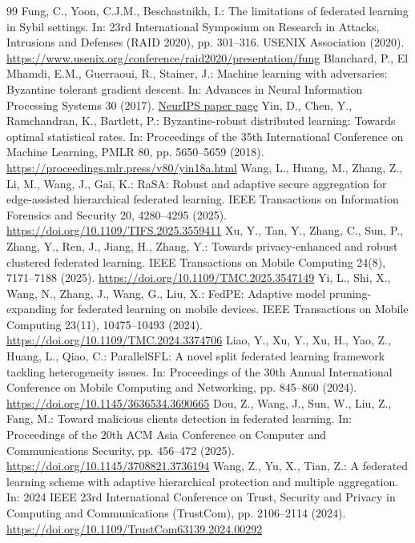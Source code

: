 \documentclass[11pt, a4paper, UTF8, fontset=fandol]{ctexart}
\begin{document}
\begin{thebibliography}{99}
     Fung, C., Yoon, C.J.M., Beschastnikh, I.: The limitations of federated learning in Sybil settings. In: 23rd International Symposium on Research in Attacks, Intrusions and Defenses (RAID 2020), pp. 301--316. USENIX Association (2020). \url{https://www.usenix.org/conference/raid2020/presentation/fung}
     Blanchard, P., El Mhamdi, E.M., Guerraoui, R., Stainer, J.: Machine learning with adversaries: Byzantine tolerant gradient descent. In: Advances in Neural Information Processing Systems 30 (2017). \href{https://papers.nips.cc/paper/6617-machine-learning-with-adversaries-byzantine-tolerant-gradient-descent}{NeurIPS paper page}
     Yin, D., Chen, Y., Ramchandran, K., Bartlett, P.: Byzantine-robust distributed learning: Towards optimal statistical rates. In: Proceedings of the 35th International Conference on Machine Learning, PMLR 80, pp. 5650--5659 (2018). \url{https://proceedings.mlr.press/v80/yin18a.html}
     Wang, L., Huang, M., Zhang, Z., Li, M., Wang, J., Gai, K.: RaSA: Robust and adaptive secure aggregation for edge-assisted hierarchical federated learning. IEEE Transactions on Information Forensics and Security 20, 4280--4295 (2025). \url{https://doi.org/10.1109/TIFS.2025.3559411}
     Xu, Y., Tan, Y., Zhang, C., Sun, P., Zhang, Y., Ren, J., Jiang, H., Zhang, Y.: Towards privacy-enhanced and robust clustered federated learning. IEEE Transactions on Mobile Computing 24(8), 7171--7188 (2025). \url{https://doi.org/10.1109/TMC.2025.3547149}
     Yi, L., Shi, X., Wang, N., Zhang, J., Wang, G., Liu, X.: FedPE: Adaptive model pruning-expanding for federated learning on mobile devices. IEEE Transactions on Mobile Computing 23(11), 10475--10493 (2024). \url{https://doi.org/10.1109/TMC.2024.3374706}
     Liao, Y., Xu, Y., Xu, H., Yao, Z., Huang, L., Qiao, C.: ParallelSFL: A novel split federated learning framework tackling heterogeneity issues. In: Proceedings of the 30th Annual International Conference on Mobile Computing and Networking, pp. 845--860 (2024). \url{https://doi.org/10.1145/3636534.3690665}
     Dou, Z., Wang, J., Sun, W., Liu, Z., Fang, M.: Toward malicious clients detection in federated learning. In: Proceedings of the 20th ACM Asia Conference on Computer and Communications Security, pp. 456--472 (2025). \url{https://doi.org/10.1145/3708821.3736194}
     Wang, Z., Yu, X., Tian, Z.: A federated learning scheme with adaptive hierarchical protection and multiple aggregation. In: 2024 IEEE 23rd International Conference on Trust, Security and Privacy in Computing and Communications (TrustCom), pp. 2106--2114 (2024). \url{https://doi.org/10.1109/TrustCom63139.2024.00292}

\end{thebibliography}
\end{document}
